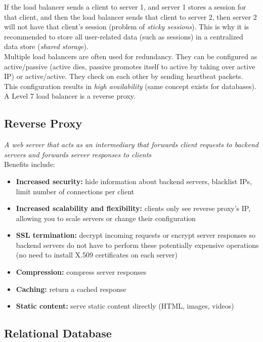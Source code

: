 \documentclass[12pt, titlepage]{article}
\begin{document}
If the load balancer sends a client to server 1, and server 1 stores a session for that client, and then the load balancer sends that client to server 2, then server 2 will not have that client's session (problem of \textit{sticky sessions}). This is why it is recommended to store all user-related data (such as sessions) in a centralized data store (\textit{shared storage}). \\

Multiple load balancers are often used for redundancy. They can be configured as active/passive (active dies, passive promotes itself to active by taking over active IP) or active/active. They check on each other by sending heartbeat packets. This configuration results in \textit{high availability} (same concept exists for databases). \\

A Level 7 load balancer is a reverse proxy.

\subsection{Reverse Proxy}

\textit{A web server that acts as an intermediary that forwards client requests to backend servers and forwards server responses to clients} \\

Benefits include:
\begin{itemize}
  \item \textbf{Increased security:} hide information about backend servers, blacklist IPs, limit number of connections per client
  \item \textbf{Increased scalability and flexibility:} clients only see reverse proxy's IP, allowing you to scale servers or change their configuration
  \item \textbf{SSL termination:} decrypt incoming requests or encrypt server responses so backend servers do not have to perform these potentially expensive operations (no need to install X.509 certificates on each server)
  \item \textbf{Compression:} compress server responses
  \item \textbf{Caching:} return a cached response
  \item \textbf{Static content:} serve static content directly (HTML, images, videos)
\end{itemize}

\subsection{Relational Database}
\end{document}
